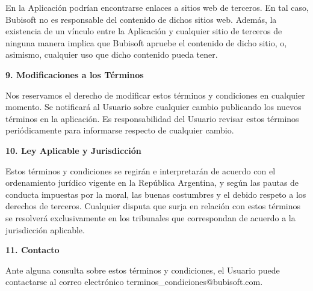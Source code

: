 \documentclass[a4paper,12pt]{article}
\begin{document}
    \par En la Aplicación podrían encontrarse enlaces a sitios web de terceros. En tal caso, Bubisoft no es responsable del contenido de dichos sitios web. Además, la existencia de un vínculo entre la Aplicación y cualquier sitio de terceros de ninguna manera implica que Bubisoft apruebe el contenido de dicho sitio, o, asimismo, cualquier uso que dicho contenido pueda tener. 
    \newline
    \par \textbf{9. Modificaciones a los Términos} 
    \newline
    \par Nos reservamos el derecho de modificar estos términos y condiciones en cualquier momento. Se notificará al Usuario sobre cualquier cambio publicando los nuevos términos en la aplicación. Es responsabilidad del Usuario revisar estos términos periódicamente para informarse respecto de cualquier cambio. 
    \newline
    \par \textbf{10. Ley Aplicable y Jurisdicción} 
    \newline
    \par Estos términos y condiciones se regirán e interpretarán de acuerdo con el ordenamiento jurídico vigente en la República Argentina, y según las pautas de conducta impuestas por la moral, las buenas costumbres y el debido respeto a los derechos de terceros. Cualquier disputa que surja en relación con estos términos se resolverá exclusivamente en los tribunales que correspondan de acuerdo a la jurisdicción aplicable. 
    \newline
    \par \textbf{11. Contacto} 
    \newline
    \par Ante alguna consulta sobre estos términos y condiciones, el Usuario puede contactarse al correo electrónico terminos\_condiciones@bubisoft.com.
\end{document}

